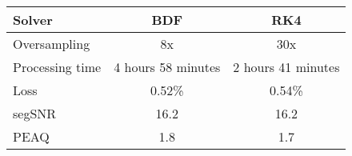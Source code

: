 \begin{tabular}{@{} l c c @{}}
    \toprule
    \textbf{Solver} & \textbf{\acs{BDF}} & \textbf{\acs{RK}4} \\ \midrule
    Oversampling & 8x & 30x \\
    Processing time & 4 hours 58 minutes & 2 hours 41 minutes \\
    Loss   & 0.52\% & 0.54\% \\
    segSNR & 16.2 & 16.2 \\
    PEAQ    & 1.8 & 1.7 \\ \bottomrule
\end{tabular}%
